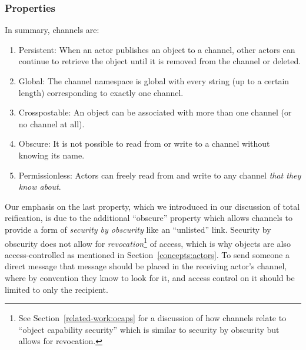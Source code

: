 





\subsubsection{Properties}

In summary, channels are:

\begin{enumerate}
\item
Persistent: When an actor publishes an object to a channel, other actors can
continue to retrieve the object until it is removed from the channel or deleted.
\item
Global: The channel namespace is global with every string (up to a certain length)
corresponding to exactly one channel.
\item
Crosspostable: An object can be associated with more than one channel (or no channel at all).
\item
Obscure: It is not possible to read from or write to a channel without knowing
its name.
\item
Permissionless: Actors can freely read from and write to any channel \emph{that they know about}.
\end{enumerate}

Our emphasis on the last property, which we introduced in our discussion of
total reification, is due to the additional ``obscure'' property
which allows channels to provide a form of \emph{security by obscurity} like an ``unlisted'' link.
Security by obscurity does not allow for \emph{revocation}\footnote{
    See Section~\ref{related-work:ocaps} for a discussion of how channels relate to ``object capability security''
    which is similar to security by obscurity but allows for revocation.
}
of access,
which is why objects are also access-controlled as mentioned in Section~\ref{concepts:actors}.
To send someone a direct message that message should be placed in
the receiving actor's channel, where by convention they know to look for it,
and access control on it should be limited to only the recipient.

